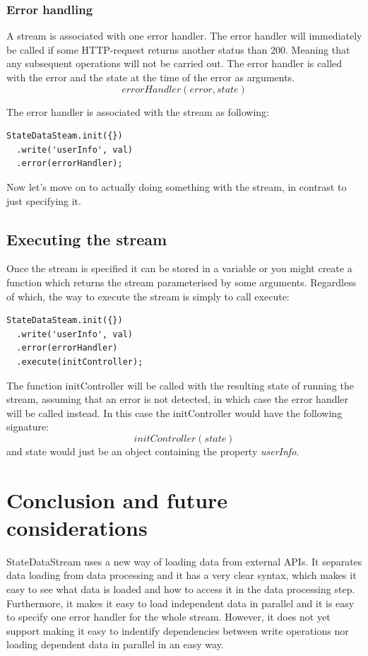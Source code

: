 \documentclass[a4paper,12pt]{article}
\begin{document}
\subsubsection{Error handling}
A stream is associated with one error handler. The error handler will immediately be called if some HTTP-request returns another status than 200. Meaning that any subsequent
operations will not be carried out. The error handler is called with the error and the state at the time of the error as arguments.
\[ errorHandler(error, state) \]

The error handler is associated with the stream as following:
\begin{lstlisting}[caption=Attaching an error handler to the stream, frame=single]
StateDataSteam.init({})
  .write('userInfo', val)
  .error(errorHandler);
\end{lstlisting}
Now let's move on to actually doing something with the stream, in contrast to just specifying it.

\subsection{Executing the stream}
Once the stream is specified it can be stored in a variable or you might create a function which returns the stream parameterised by some arguments.
Regardless of which, the way to execute the stream is simply to call execute:

\begin{lstlisting}[caption=Executing the stream, frame=single]
StateDataSteam.init({})
  .write('userInfo', val)
  .error(errorHandler)
  .execute(initController);
\end{lstlisting}
The function initController will be called with the resulting state of running the stream, assuming that an error is not detected, in which case the error handler will be called instead. In this case the initController would have the following signature:
\[ initController(state) \]
and state would just be an object containing the property \emph{userInfo}.


\section{Conclusion and future considerations}
\label{sec:future}
StateDataStream uses a new way of loading data from external APIs. It separates data loading from data processing and it has a very clear syntax, which makes it easy to see 
what data is loaded and how to access it in the data processing step. Furthermore, it makes it easy to load independent data in parallel and it is easy to specify one 
error handler for the whole stream. However, it does not yet support making it easy to indentify dependencies between write operations nor loading dependent data in parallel
in an easy way.
\end{document}
